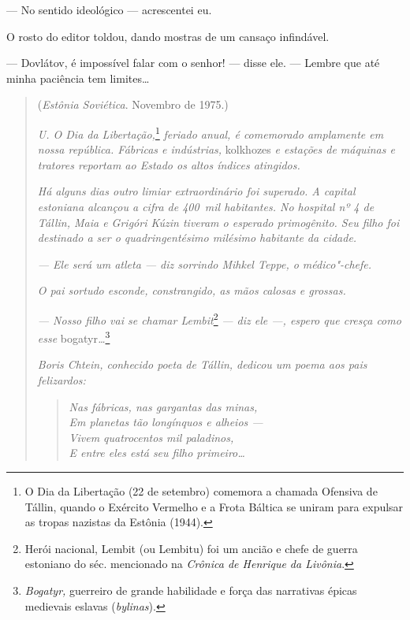 --- No sentido ideológico --- acrescentei eu.

O rosto do editor toldou, dando mostras de um cansaço infindável.

--- Dovlátov, é impossível falar com o senhor! --- disse ele. --- Lembre
que até minha paciência tem limites\ldots{}


\movetooddpage
\begin{center}
{}
\end{center}

\begin{quotation}
\begin{flushright}
(\emph{Estônia Soviética}. Novembro de 1975.)
\end{flushright}
\vspace{4pt}
\noindent\emph{U. O Dia da Libertação,}\footnote{O Dia da
  Libertação (22 de setembro) comemora a chamada Ofensiva de Tállin,
  quando o Exército Vermelho e a Frota Báltica se uniram para expulsar
  as tropas nazistas da Estônia (1944).} \emph{feriado anual, é
comemorado amplamente em nossa república. Fábricas e indústrias,}
kolkhozes \emph{e estações de máquinas e tratores reportam ao Estado os %
altos índices atingidos.}

\emph{Há alguns dias outro limiar extraordinário foi superado. A capital
estoniana alcançou a cifra de 400~mil habitantes. No hospital nº 4 de
Tállin, Maia e Grigóri Kúzin tiveram o esperado primogênito. Seu filho
foi destinado a ser o quadringentésimo milésimo habitante da cidade.}

\emph{--- Ele será um atleta --- diz sorrindo Mihkel Teppe, o
médico"-chefe.}

\emph{O pai sortudo esconde, constrangido, as mãos calosas e grossas.}

\emph{--- Nosso filho vai se chamar Lembit}\footnote{Herói nacional,
  Lembit (ou Lembitu) foi um ancião e chefe de guerra estoniano do séc.
   mencionado na \emph{Crônica de Henrique da Livônia}.} \emph{--- diz ele
---, espero que cresça como esse} bogatyr\emph{\ldots{}}\footnote{\emph{Bogatyr,}
  guerreiro de grande habilidade e força das narrativas épicas medievais
  eslavas (\emph{bylinas}).}

\emph{Boris Chtein, conhecido poeta de Tállin, dedicou um poema aos pais
felizardos:}

\begin{verse}
\emph{Nas fábricas, nas gargantas das minas,}\\
\emph{Em planetas tão longínquos e \qb{}alheios ---}\\
\emph{Vivem quatrocentos mil paladinos,}\\
\emph{E entre eles está seu filho primeiro\ldots{}}
\end{verse}


\end{quotation}
